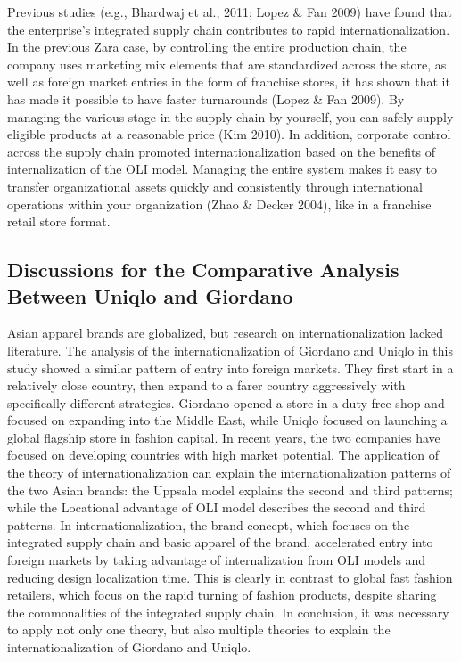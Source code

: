 \documentclass[12pt,a4paper]{article}
\begin{document}
Previous studies (e.g., Bhardwaj et al., 2011; Lopez \& Fan 2009) have
found that the enterprise's integrated supply chain contributes to rapid
internationalization. In the previous Zara case, by controlling the
entire production chain, the company uses marketing mix elements that
are standardized across the store, as well as foreign market entries in
the form of franchise stores, it has shown that it has made it possible
to have faster turnarounds (Lopez \& Fan 2009). By managing the various
stage in the supply chain by yourself, you can safely supply eligible
products at a reasonable price (Kim 2010). In addition, corporate
control across the supply chain promoted internationalization based on
the benefits of internalization of the OLI model. Managing the entire
system makes it easy to transfer organizational assets quickly and
consistently through international operations within your organization
(Zhao \& Decker 2004), like in a franchise retail store format.

\hypertarget{discussions-for-the-comparative-analysis-between-uniqlo-and-giordano}{%
\subsection{Discussions for the Comparative Analysis Between Uniqlo and
Giordano}\label{discussions-for-the-comparative-analysis-between-uniqlo-and-giordano}}

Asian apparel brands are globalized, but research on
internationalization lacked literature. The analysis of the
internationalization of Giordano and Uniqlo in this study showed a
similar pattern of entry into foreign markets. They first start in a
relatively close country, then expand to a farer country aggressively
with specifically different strategies. Giordano opened a store in a
duty-free shop and focused on expanding into the Middle East, while
Uniqlo focused on launching a global flagship store in fashion capital.
In recent years, the two companies have focused on developing countries
with high market potential. The application of the theory of
internationalization can explain the internationalization patterns of
the two Asian brands: the Uppsala model explains the second and third
patterns; while the Locational advantage of OLI model describes the
second and third patterns. In internationalization, the brand concept,
which focuses on the integrated supply chain and basic apparel of the
brand, accelerated entry into foreign markets by taking advantage of
internalization from OLI models and reducing design localization time.
This is clearly in contrast to global fast fashion retailers, which
focus on the rapid turning of fashion products, despite sharing the
commonalities of the integrated supply chain. In conclusion, it was
necessary to apply not only one theory, but also multiple theories to
explain the internationalization of Giordano and Uniqlo.
\end{document}
